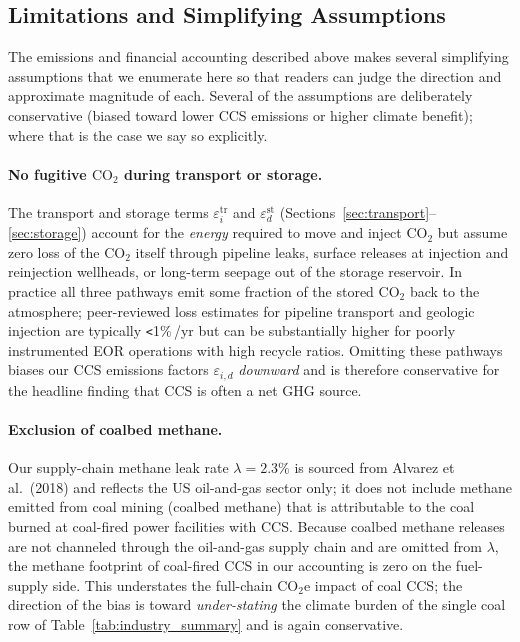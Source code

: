 \documentclass[11pt]{article}
\newcommand{\cotwo}{\ensuremath{\mathrm{CO_2}}}
\newcommand{\cotwoe}{\ensuremath{\mathrm{CO_{2}e}}}
\begin{document}
\subsection{Limitations and Simplifying Assumptions}
\label{sec:limitations}

The emissions and financial accounting described above makes several simplifying assumptions that we enumerate here so that readers can judge the direction and approximate magnitude of each. Several of the assumptions are deliberately conservative (biased toward lower CCS emissions or higher climate benefit); where that is the case we say so explicitly.

\paragraph{No fugitive \cotwo{} during transport or storage.} The transport and storage terms $\varepsilon_i^{\text{tr}}$ and $\varepsilon_d^{\text{st}}$ (Sections~\ref{sec:transport}--\ref{sec:storage}) account for the \emph{energy} required to move and inject \cotwo{} but assume zero loss of the \cotwo{} itself through pipeline leaks, surface releases at injection and reinjection wellheads, or long-term seepage out of the storage reservoir. In practice all three pathways emit some fraction of the stored \cotwo{} back to the atmosphere; peer-reviewed loss estimates for pipeline transport and geologic injection are typically \texttt{<}1\%\,/yr but can be substantially higher for poorly instrumented EOR operations with high recycle ratios. Omitting these pathways biases our CCS emissions factors $\varepsilon_{i,d}$ \emph{downward} and is therefore conservative for the headline finding that CCS is often a net GHG source.

\paragraph{Exclusion of coalbed methane.} Our supply-chain methane leak rate $\lambda = 2.3\%$ is sourced from Alvarez et al.\ (2018) and reflects the US oil-and-gas sector only; it does not include methane emitted from coal mining (coalbed methane) that is attributable to the coal burned at coal-fired power facilities with CCS. Because coalbed methane releases are not channeled through the oil-and-gas supply chain and are omitted from $\lambda$, the methane footprint of coal-fired CCS in our accounting is zero on the fuel-supply side. This understates the full-chain \cotwoe{} impact of coal CCS; the direction of the bias is toward \emph{under-stating} the climate burden of the single coal row of Table~\ref{tab:industry_summary} and is again conservative.
\end{document}
